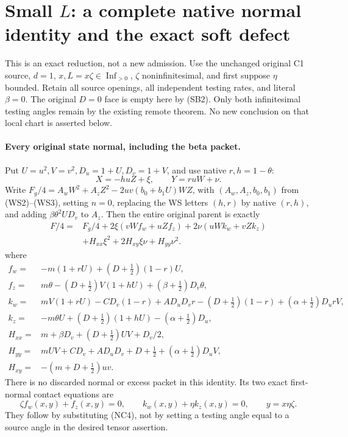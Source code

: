 \section{Small $L$: a complete native normal identity and the exact soft defect}
\label{sec:r8-small-L-native-normal}

This is an exact reduction, not a new admission. Use the unchanged
original C1 source, $d=1$, $x,L=x\zeta\in\operatorname{Inf}_{>0}$,
$\zeta$ noninfinitesimal, and first suppose $\eta$ bounded. Retain
all source openings, all independent testing rates, and literal
$\beta=0$. The original $D=0$ face is empty here by (SB2).
Only both infinitesimal testing angles remain by the existing remote
theorem. No new conclusion on that local chart is asserted below.

\paragraph{Every original state normal, including the beta packet.}
Put $U=u^2,V=v^2,D_u=1+U,D_v=1+V$, and use native $r,h=1-\theta$:
\[
 X=-huZ+\xi,\qquad Y=ruW+\nu.
\]
Write $F_g/4=A_wW^2+A_zZ^2-2uv(b_0+b_1U)WZ$, with
$(A_w,A_z,b_0,b_1)$ from (WS2)--(WS3), setting $n=0$, replacing
the WS letters $(h,r)$ by native $(r,h)$, and adding
$\beta\theta^2UD_v$ to $A_z$. Then the entire original parent is
exactly
\[
\begin{split}
 F/4={}&F_g/4+2\xi(vWf_w+uZf_z)+2\nu(uWk_w+vZk_z)\\
 &+H_{xx}\xi^2+2H_{xy}\xi\nu+H_{yy}\nu^2.
\end{split}                                               \tag{SN1}
\]
where
\[
\begin{aligned}
 f_w={}&-m(1+rU)+(D+\tfrac12)(1-r)U,\\
 f_z={}&m\theta-(D+\tfrac12)V(1+hU)
                    +(\beta+\tfrac12)D_v\theta,\\
 k_w={}&mV(1+rU)-CD_v(1-r)+AD_uD_vr
             -(D+\tfrac12)(1-r)+(\alpha+\tfrac12)D_urV,\\
 k_z={}&-m\theta U+(D+\tfrac12)(1+hU)
                              -(\alpha+\tfrac12)D_u,\\
 H_{xx}={}&m+\beta D_v+(D+\tfrac12)UV+D_v/2,\\
 H_{yy}={}&mUV+CD_v+AD_uD_v+D+\tfrac12
                              +(\alpha+\tfrac12)D_uV,\\
 H_{xy}={}&-(m+D+\tfrac12)uv.
\end{aligned}                                                   \tag{SN2}
\]
There is no discarded normal or excess packet in this identity.
Its two exact first-normal contact equations are
\[
 \zeta f_w(x,y)+f_z(x,y)=0,\qquad
 k_w(x,y)+\eta k_z(x,y)=0,\qquad y=x\eta\zeta.             \tag{SN3}
\]
They follow by substituting (NC4), not by setting a testing angle
equal to a source angle in the desired tensor assertion.

